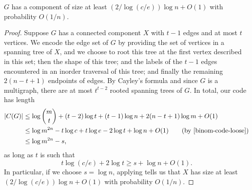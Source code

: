 \begin{lem}
  $G$ has a component of size at least $(2/\log(c/e))\log n + O(1)$
  with probability $O(1/n)$.
\end{lem}
\begin{proof}
  Suppose $G$ has a connected component $X$ with $t - 1$ edges and at
  most $t$ vertices. We encode the edge set of $G$ by providing the
  set of vertices in a spanning tree of $X$, and we choose to root
  this tree at the first vertex described in this set; then the shape
  of this tree; and the labels of the $t - 1$ edges encountered in an
  inorder traversal of this tree; and finally the remaining
  $2(n - t + 1)$ endpoints of edges. By Cayley's formula and since $G$
  is a multigraph, there are at most $t^{t - 2}$ rooted spanning trees
  of $G$. In total, our code has length
  \begin{align*}
    |C(G)| &\le \log \binom{m}{t} + (t - 2) \log t + (t - 1) \log n + 2 (n - t + 1) \log m + O(1) \\
           &\le \log m^{2n} - t\log c + t\log e - 2\log t + \log n + O(1) \tag{by \eqref{binom-code-loose}} \\
           &\le \log m^{2n} - s ,
  \end{align*}
  as long as $t$ is such that
  \[t \log (c/e) + 2\log t \geq s + \log n + O(1) .\]
  In particular, if we choose $s = \log n$, applying 
  tells us that $X$ has size at least $(2/\log (c/e))\log n + O(1)$
  with probability $O(1/n)$.
\end{proof}

